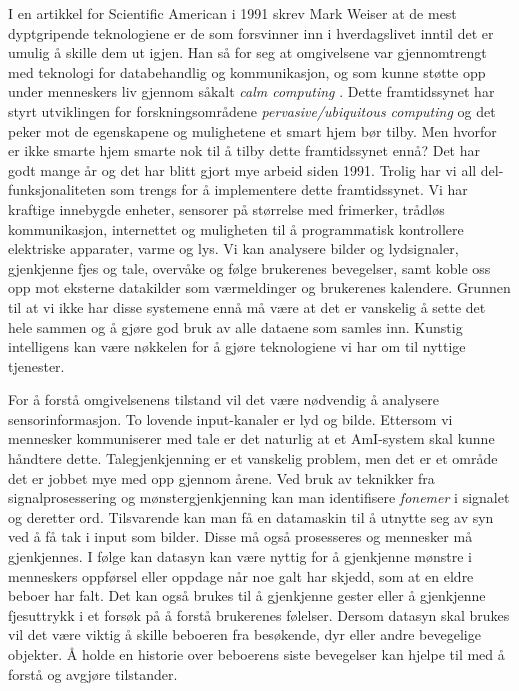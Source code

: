 {I en artikkel for Scientific American i 1991 skrev Mark Weiser at de mest dyptgripende teknologiene er de som forsvinner inn i hverdagslivet inntil det er umulig å skille dem ut igjen. Han så for seg at omgivelsene var gjennomtrengt med teknologi for databehandlig og kommunikasjon, og som kunne støtte opp under menneskers liv gjennom såkalt \emph{calm computing} \citet{weiser91}. Dette framtidssynet har styrt utviklingen for forskningsområdene \emph{pervasive/ubiquitous computing} og det peker mot de egenskapene og mulighetene et smart hjem bør tilby. Men hvorfor er ikke smarte hjem smarte nok til å tilby dette framtidssynet ennå? Det har godt mange år og det har blitt gjort mye arbeid siden 1991. Trolig har vi all del-funksjonaliteten som trengs for å implementere dette framtidssynet. Vi har kraftige innebygde enheter, sensorer på størrelse med frimerker, trådløs kommunikasjon, internettet og muligheten til å programmatisk kontrollere elektriske apparater, varme og lys. Vi kan analysere bilder og lydsignaler, gjenkjenne fjes og tale, overvåke og følge brukerenes bevegelser, samt koble oss opp mot eksterne datakilder som værmeldinger og brukerenes kalendere. Grunnen til at vi ikke har disse systemene ennå må være at det er vanskelig å sette det hele sammen og å gjøre god bruk av alle dataene som samles inn. Kunstig intelligens kan være nøkkelen for å gjøre teknologiene vi har om til nyttige tjenester.

For å forstå omgivelsenens tilstand vil det være nødvendig å analysere sensorinformasjon. To lovende input-kanaler er lyd og bilde. Ettersom vi mennesker kommuniserer med tale er det naturlig at et AmI-system skal kunne håndtere dette. Talegjenkjenning er et vanskelig problem, men det er et område det er jobbet mye med opp gjennom årene. Ved bruk av teknikker fra signalprosessering og mønstergjenkjenning kan man identifisere \emph{fonemer} i signalet og deretter ord. Tilsvarende kan man få en datamaskin til å utnytte seg av syn ved å få tak i input som bilder. Disse må også prosesseres og mennesker må gjenkjennes. I følge \citet{augustonugent06} kan datasyn kan være nyttig for å gjenkjenne mønstre i menneskers oppførsel eller oppdage når noe galt har skjedd, som at en eldre beboer har falt. Det kan også brukes til å gjenkjenne gester eller å gjenkjenne fjesuttrykk i et forsøk på å forstå brukerenes følelser. Dersom datasyn skal brukes vil det være viktig å skille beboeren fra besøkende, dyr eller andre bevegelige objekter. Å holde en historie over beboerens siste bevegelser kan hjelpe til med å forstå og avgjøre tilstander. 

}
